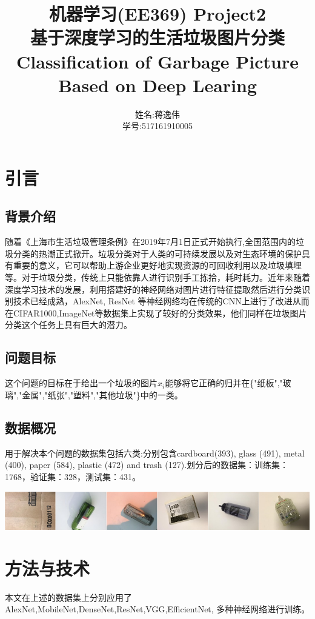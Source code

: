 \documentclass[UTF8]{ctexart}
\title{机器学习(EE369)  Project2\\基于深度学习的生活垃圾图片分类\\Classification of Garbage Picture Based on Deep Learing}
\author{姓名:蒋逸伟 \\学号:517161910005}
\date{}
\begin{document}
\maketitle
\newpage
\tableofcontents
\newpage
\section{引言}
\subsection{背景介绍}
随着《上海市生活垃圾管理条例》\cite{garbage}在2019年7月1日正式开始执行,全国范围内的垃圾分类的热潮正式掀开。垃圾分类对于人类的可持续发展以及对生态环境的保护具有重要的意义，它可以帮助上游企业更好地实现资源的可回收利用以及垃圾填埋等。对于垃圾分类，传统上只能依靠人进行识别手工拣拾，耗时耗力。近年来随着深度学习技术的发展，利用搭建好的神经网络对图片进行特征提取然后进行分类识别技术已经成熟，AlexNet\cite{krizhevsky2014weird},
ResNet\cite{10.1007/978-3-319-46493-0_38}
等神经网络均在传统的CNN上进行了改进从而在CIFAR1000,ImageNet等数据集上实现了较好的分类效果，他们同样在垃圾图片分类这个任务上具有巨大的潜力。
\subsection{问题目标}
这个问题的目标在于给出一个垃圾的图片$x_i$能够将它正确的归并在\{"纸板","玻璃","金属","纸张","塑料","其他垃圾"\}中的一类。
\subsection{数据概况}
用于解决本个问题的数据集包括六类:分别包含cardboard(393), glass
(491), metal (400), paper (584), plastic (472) and trash (127).划分后的数据集：训练集：1768，验证集：328，测试集：431。

\includegraphics[scale=0.5]{gb.png}
\newpage
\section{方法与技术}
本文在上述的数据集上分别应用了AlexNet,MobileNet,DenseNet,ResNet,VGG,EfficientNet,
多种神经网络进行训练。
\end{document}

